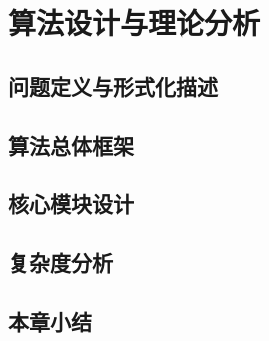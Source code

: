 \chapter{算法设计与理论分析}
\label{ch:methods}


\section{问题定义与形式化描述}
\label{sec:problem-definition}

\section{算法总体框架}
\label{sec:algorithm-overview}

\section{核心模块设计}
\label{sec:core-modules}

\section{复杂度分析}
\label{sec:complexity}

\section{本章小结}
\label{sec:ch3-summary}
